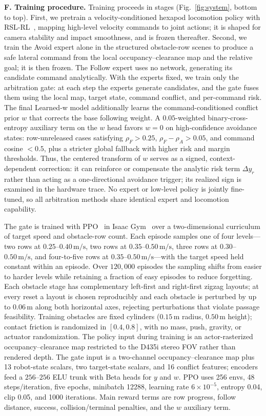 \documentclass[letterpaper, 10 pt, conference]{ieeeconf}
\newcommand{\rFdir}{\rho_F}
\newcommand{\rAdir}{\rho_A}
\newcommand{\dyrdir}{\Delta y_r}
\newcommand{\msec}{\,\mathrm{m/s}}
\begin{document}
\textbf{F. Training procedure.}
Training proceeds in stages (Fig.~\ref{fig:system}, bottom to top).
First, we pretrain a velocity-conditioned hexapod locomotion policy with
RSL-RL~\cite{ref:rudin}, mapping high-level velocity commands to joint
actions; it is shaped for camera stability and impact smoothness, and is
frozen thereafter. Second, we train the Avoid expert alone in the
structured obstacle-row scenes to produce a safe lateral command from the
local occupancy--clearance map and the relative goal; it is then frozen.
The Follow expert uses no network, generating its candidate command
analytically. With the experts fixed, we train only the arbitration gate:
at each step the experts generate candidates, and the gate fuses them
using the local map, target state, command conflict, and per-command
risk. The final Learned-w model additionally learns the
command-conditioned conflict prior $w$ that corrects the base following
weight. A $0.05$-weighted binary-cross-entropy auxiliary term on the $w$
head favors $w=0$ on high-confidence avoidance states:
row-unreleased cases satisfying $\rFdir>0.25$,
$\rFdir-\rAdir>0.05$, and command cosine $<0.5$, plus a stricter global
fallback with higher risk and margin thresholds. Thus, the centered transform
of $w$ serves as a signed, context-dependent correction: it can reinforce or
compensate the analytic risk term $\dyrdir$ rather than acting as a
one-directional avoidance trigger; its realized sign is examined in the
hardware trace. No expert or low-level policy is jointly
fine-tuned, so all arbitration methods share identical expert and
locomotion capability.

The gate is trained with PPO~\cite{ref:ppo} in Isaac Gym~\cite{ref:isaac}
over a two-dimensional curriculum of target speed and obstacle-row count.
Each episode samples one of four levels---two rows at
$0.25$--$0.40\msec$, two rows at $0.35$--$0.50\msec$, three rows at
$0.30$--$0.50\msec$, and four-to-five rows at $0.35$--$0.50\msec$---with
the target speed held constant within an episode. Over $120{,}000$
episodes the sampling shifts from easier to harder levels while retaining
a fraction of easy episodes to reduce forgetting. Each obstacle stage has
complementary left-first and right-first zigzag layouts; at every reset a
layout is chosen reproducibly and each obstacle is perturbed by up to
$0.06\,\mathrm{m}$ along both horizontal axes, rejecting perturbations
that violate passage feasibility. Training obstacles are fixed cylinders
($0.15\,\mathrm{m}$ radius, $0.50\,\mathrm{m}$ height); contact friction
is randomized in $[0.4,0.8]$, with no mass, push, gravity, or actuator
randomization. The policy input during training is an actor-rasterized
occupancy--clearance map restricted to the D435i stereo FOV rather than
rendered depth.
The gate input is a two-channel occupancy--clearance map plus 13 robot-state scalars,
two target-state scalars, and 16 conflict features; encoders feed a
$256$--$256$ ELU trunk with Beta heads for $y$ and $w$. PPO uses 256 envs,
48 steps/iteration, five epochs, minibatch 12288, learning rate
$6{\times}10^{-5}$, entropy 0.04, clip 0.05, and 1000 iterations. Main
reward terms are row progress, follow distance, success, collision/terminal
penalties, and the $w$ auxiliary term.
\end{document}
